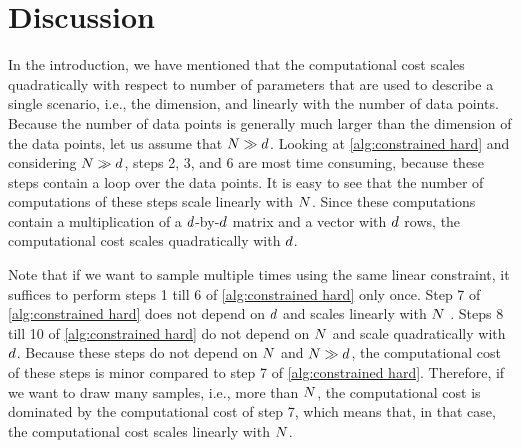 \section{Discussion}
\label{sec:discussion}

In the introduction, we have mentioned that the computational cost scales quadratically with respect to number of parameters that are used to describe a single scenario, i.e., the dimension, and linearly with the number of data points.
Because the number of data points is generally much larger than the dimension of the data points, let us assume that $N \gg d$.
Looking at \cref{alg:constrained hard} and considering $N \gg d$, steps 2, 3, and 6 are most time consuming, because these steps contain a loop over the data points. 
It is easy to see that the number of computations of these steps scale linearly with $N$. 
Since these computations contain a multiplication of a $d$-by-$d$ matrix and a vector with $d$ rows, the computational cost scales quadratically with $d$. 

Note that if we want to sample multiple times using the same linear constraint, it suffices to perform steps 1 till 6 of \cref{alg:constrained hard} only once.
Step 7 of \cref{alg:constrained hard} does not depend on $d$ and scales linearly with $N$ \autocite{vose1991linear}.
Steps 8 till 10 of \cref{alg:constrained hard} do not depend on $N$ and scale quadratically with $d$.
Because these steps do not depend on $N$ and $N \gg d$, the computational cost of these steps is minor compared to step 7 of \cref{alg:constrained hard}. 
\cstarta Therefore, if we want to draw many samples, i.e., more than $N$, the computational cost is dominated by the computational cost of step 7, which means that, in that case, the computational cost scales linearly with $N$. \cenda

